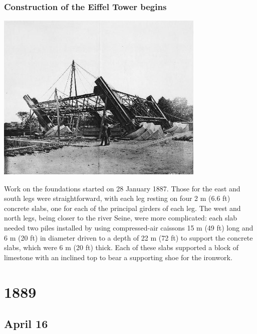 \documentclass[11pt]{report}
\begin{document}
\subsection{Construction of the Eiffel Tower begins}
\vspace{2mm}\begin{center}\includegraphics[width=10cm]{./img/eiffelTowerConstruction.jpg}\end{center}
Work on the foundations started on 28 January 1887. Those for the east and south legs were straightforward, with each leg resting on four 2 m (6.6 ft) concrete slabs, one for each of the principal girders of each leg. The west and north legs, being closer to the river Seine, were more complicated: each slab needed two piles installed by using compressed-air caissons 15 m (49 ft) long and 6 m (20 ft) in diameter driven to a depth of 22 m (72 ft) to support the concrete slabs, which were 6 m (20 ft) thick. Each of these slabs supported a block of limestone with an inclined top to bear a supporting shoe for the ironwork.



\chapter{1889}
\section{April 16}
\end{document}
